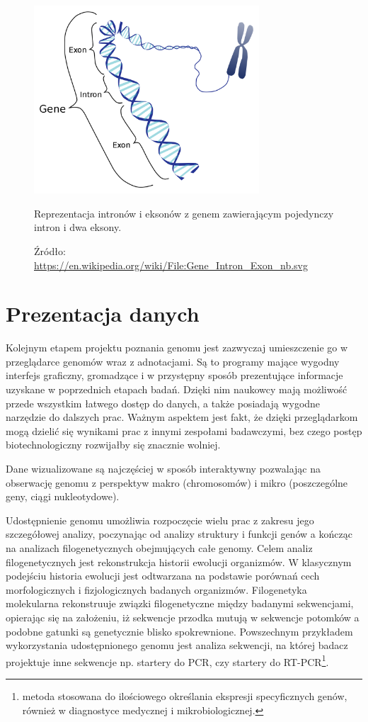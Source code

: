 \begin{figure}[h]
	\centering
	\includegraphics[width=0.75\textwidth]{img/intron-exon.png}
	\caption{Reprezentacja intronów i eksonów z genem zawierającym pojedynczy intron i dwa eksony.}
	\vspace{-0.5cm}
	\caption*{\scriptsize Źródło: \url{https://en.wikipedia.org/wiki/File:Gene\_Intron\_Exon\_nb.svg}}
	\label{img:intron-exon}
\end{figure}


\section{Prezentacja danych}
Kolejnym etapem projektu poznania genomu jest zazwyczaj umieszczenie go w przeglądarce genomów wraz z adnotacjami. Są to programy mające wygodny interfejs graficzny, gromadzące i w przystępny sposób prezentujące informacje uzyskane w poprzednich etapach badań. Dzięki nim naukowcy mają możliwość przede wszystkim łatwego dostęp do danych, a także posiadają wygodne narzędzie do dalszych prac. 
Ważnym aspektem jest fakt, że dzięki przeglądarkom mogą dzielić się wynikami prac z innymi zespołami badawczymi, bez czego postęp biotechnologiczny rozwijałby się znacznie wolniej.

Dane wizualizowane są najczęściej w sposób interaktywny pozwalając na obserwację genomu z perspektyw makro (chromosomów) i mikro (poszczególne geny, ciągi nukleotydowe).

Udostępnienie genomu umożliwia rozpoczęcie wielu prac z zakresu jego szczegółowej analizy, poczynając od analizy struktury i funkcji genów a kończąc na analizach filogenetycznych obejmujących całe genomy. 
Celem analiz filogenetycznych jest rekonstrukcja historii ewolucji  organizmów. W klasycznym podejściu historia ewolucji jest odtwarzana na podstawie porównań cech morfologicznych i fizjologicznych badanych organizmów.
Filogenetyka molekularna rekonstruuje związki filogenetyczne między badanymi sekwencjami, opierając się na założeniu, iż sekwencje przodka mutują w sekwencje potomków a podobne gatunki są genetycznie blisko spokrewnione.
Powszechnym przykładem wykorzystania udostępnionego genomu jest analiza sekwencji, na której badacz projektuje inne sekwencje np. startery do PCR, czy startery do RT-PCR\footnote{metoda stosowana do ilościowego określania ekspresji specyficznych genów, również w diagnostyce medycznej i mikrobiologicznej.}.


